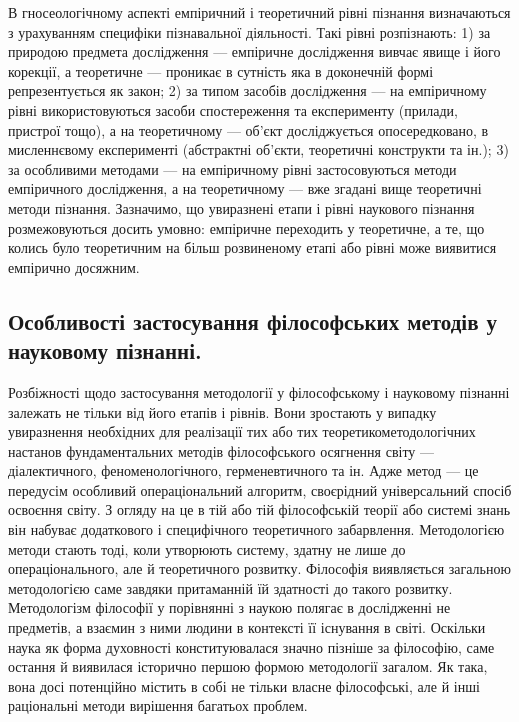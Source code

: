 В гносеологічному аспекті емпіричний і теоретичний рівні пізнання
визначаються з урахуванням специфіки пізнавальної діяльності. Такі рівні
розпізнають: 1) за природою предмета дослідження --- емпіричне дослідження
вивчає явище і його корекції, а теоретичне --- проникає в сутність яка в
доконечній формі репрезентується як закон; 2) за типом засобів дослідження ---
на емпіричному рівні використовуються засоби спостереження та експерименту
(прилади, пристрої тощо), а на теоретичному --- об’єкт досліджується
опосередковано, в мисленнєвому експерименті (абстрактні об’єкти, теоретичні
конструкти та ін.); 3) за особливими методами --- на емпіричному рівні
застосовуються методи емпіричного дослідження, а на теоретичному --- вже
згадані вище теоретичні методи пізнання. Зазначимо, що увиразнені етапи і
рівні наукового пізнання розмежовуються досить умовно: емпіричне
переходить у теоретичне, а те, що колись було теоретичним на більш
розвиненому етапі або рівні може виявитися емпірично досяжним.

\subsection[Особливості застосування філософських методів.]{Особливості застосування філософських методів у науковому пізнанні.}
Розбіжності щодо застосування методології у філософському і
науковому пізнанні залежать не тільки від його етапів і рівнів. Вони зростають
у випадку увиразнення необхідних для реалізації тих або тих теоретикометодологічних настанов фундаментальних методів філософського осягнення
світу --- діалектичного, феноменологічного, герменевтичного та ін. Адже метод
--- це передусім особливий операціональний алгоритм, своєрідний
універсальний спосіб освоєння світу. З огляду на це в тій або тій філософській
теорії або системі знань він набуває додаткового і специфічного теоретичного
забарвлення. Методологією методи стають тоді, коли утворюють систему,
здатну не лише до операціонального, але й теоретичного розвитку. Філософія
виявляється загальною методологією саме завдяки притаманній їй здатності до
такого розвитку. Методологізм філософії у порівнянні з наукою полягає в
дослідженні не предметів, а взаємин з ними людини в контексті її існування в
світі. Оскільки наука як форма духовності конституювалася значно пізніше за
філософію, саме остання й виявилася історично першою формою методології
загалом. Як така, вона досі потенційно містить в собі не тільки власне
філософські, але й інші раціональні методи вирішення багатьох проблем.

